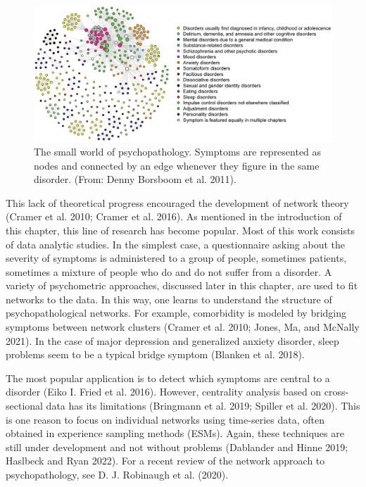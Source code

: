 \documentclass[
  a4paper,
  DIV=11,
  numbers=noendperiod,
  oneside]{scrreprt}
\begin{document}
\begin{figure}

{\centering \includegraphics[width=6.26389in,height=\textheight]{media/ch6/image8.jpg}

}

\caption{\label{fig-ch6-img8-old-77}The small world of psychopathology.
Symptoms are represented as nodes and connected by an edge whenever they
figure in the same disorder. (From: Denny Borsboom et al. 2011).}

\end{figure}

This lack of theoretical progress encouraged the development of network
theory (Cramer et al. 2010; Cramer et al. 2016). As mentioned in the
introduction of this chapter, this line of research has become popular.
Most of this work consists of data analytic studies. In the simplest
case, a questionnaire asking about the severity of symptoms is
administered to a group of people, sometimes patients, sometimes a
mixture of people who do and do not suffer from a disorder. A variety of
psychometric approaches, discussed later in this chapter, are used to
fit networks to the data. In this way, one learns to understand the
structure of psychopathological networks. For example, comorbidity is
modeled by bridging symptoms between network clusters (Cramer et al.
2010; Jones, Ma, and McNally 2021). In the case of major depression and
generalized anxiety disorder, sleep problems seem to be a typical bridge
symptom (Blanken et al. 2018).

The most popular application is to detect which symptoms are central to
a disorder (Eiko I. Fried et al. 2016). However, centrality analysis
based on cross-sectional data has its limitations (Bringmann et al.
2019; Spiller et al. 2020). This is one reason to focus on individual
networks using time-series data, often obtained in experience sampling
methods (ESMs). Again, these techniques are still under development and
not without problems (Dablander and Hinne 2019; Haslbeck and Ryan 2022).
For a recent review of the network approach to psychopathology, see D.
J. Robinaugh et al. (2020).
\end{document}
